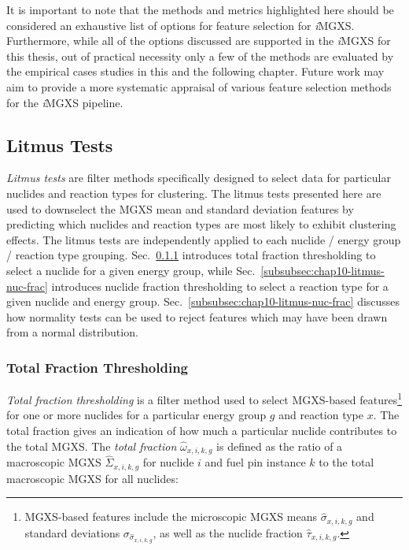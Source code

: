 It is important to note that the methods and metrics highlighted here should be considered an exhaustive list of options for feature selection for \textit{i}\ac{MGXS}. Furthermore, while all of the options discussed are supported in the \textit{i}\ac{MGXS} for this thesis, out of practical necessity only a few of the methods are evaluated by the empirical cases studies in this and the following chapter. Future work may aim to provide a more systematic appraisal of various feature selection methods for the \textit{i}\ac{MGXS} pipeline.

\subsection{Litmus Tests}
\label{subsec:chap10-litmus}

\textit{Litmus tests} are filter methods specifically designed to select data for particular nuclides and reaction types for clustering. The litmus tests presented here are used to downselect the \ac{MGXS} mean and standard deviation features by predicting which nuclides and reaction types are most likely to exhibit clustering effects. The litmus tests are independently applied to each nuclide / energy group / reaction type grouping. Sec.~\ref{subsubsec:chap10-litmus-tot-frac} introduces total fraction thresholding to select a nuclide for a given energy group, while Sec.~\ref{subsubsec:chap10-litmus-nuc-frac} introduces nuclide fraction thresholding to select a reaction type for a given nuclide and energy group. Sec.~\ref{subsubsec:chap10-litmus-nuc-frac} discusses how normality tests can be used to reject features which may have been drawn from a normal distribution.

\subsubsection{Total Fraction Thresholding}
\label{subsubsec:chap10-litmus-tot-frac}

\textit{Total fraction thresholding} is a filter method used to select \ac{MGXS}-based features\footnote{\ac{MGXS}-based features include the microscopic \ac{MGXS} means $\hat{\sigma}_{x,i,k,g}$ and standard deviations $\sigma_{\hat{\sigma}_{x,i,k,g}}$, as well as the nuclide fraction $\hat{\tau}_{x,i,k,g}$.} for one or more nuclides for a particular energy group $g$ and reaction type $x$.
The total fraction gives an indication of how much a particular nuclide contributes to the total \ac{MGXS}. 
The \textit{total fraction} $\hat{\omega}_{x,i,k,g}$ is defined as the ratio of a macroscopic \ac{MGXS} $\hat{\Sigma}_{x,i,k,g}$ for nuclide $i$ and fuel pin instance $k$ to the total macroscopic \ac{MGXS} for all nuclides:


